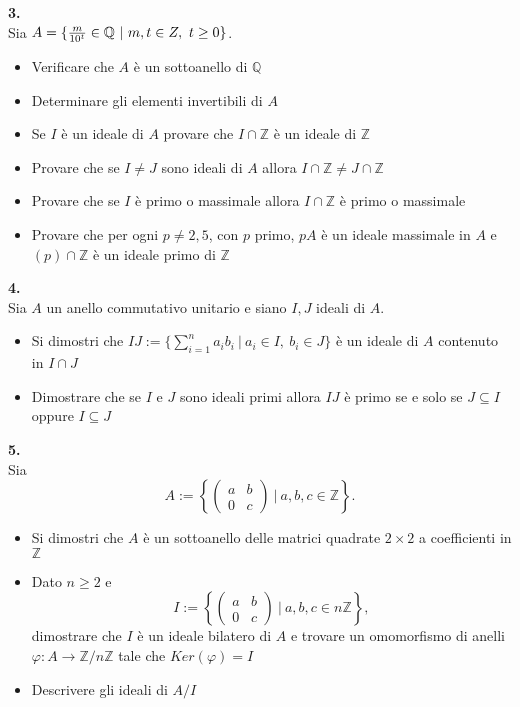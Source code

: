 \documentclass[italian,a4paper,11pt]
{article}
\newcommand{\Q}{\mathbb{Q}}
\newcommand{\Z}{\mathbb Z}
\newcommand{\acc}{\`}
\begin{document}
\vspace{0.4 cm}
\noindent
\begin{Ex}\textbf{ 3.}\\
Sia $A=\{{m\over{10^t}}\in \Q \ | \ m,t\in Z, \ t\geq 0\}$. 
\begin{itemize}
\item Verificare che $A$ \acc e un sottoanello di $\Q$
\item Determinare gli elementi invertibili di $A$
\item Se $I$ \acc e un ideale di $A$ provare che $I\cap\Z$ \acc e un ideale di $\Z$
\item Provare che se $I\neq J$ sono ideali di $A$ allora $I\cap\Z \neq J\cap\Z$
\item Provare che se $I$ \acc e primo o massimale allora $I\cap\Z$ \acc e primo o massimale
\item Provare che per ogni $p\neq 2,5$, con $p$ primo, $pA$ \acc e un ideale massimale in $A$ e $(p)\cap \Z$ \acc e un ideale primo di $\Z$
\end{itemize}
\end{Ex}

\vspace{0.4 cm}
\noindent
\begin{Ex}\textbf{ 4.}\\
Sia $A$ un anello commutativo unitario e siano $I,J$ ideali di $A$.
\begin{itemize}
\item Si dimostri che $IJ:=\{\sum_{i=1}^na_ib_i \ | \ a_i\in I, \ b_i\in J\}$ \acc e un ideale di $A$ contenuto in $I\cap J$
\item Dimostrare che se $I$ e $J$ sono ideali primi allora $IJ$ \acc e primo se e solo se $J\subseteq I$ oppure $I\subseteq J$ 
\end{itemize}
\end{Ex}


\vspace{0.4 cm}
\noindent
\begin{Ex}\textbf{ 5.}\\
Sia $$A:=\left\{\left(\begin{matrix} a & b \\ 0 & c \end{matrix} \right) \ | \ a,b,c\in \Z \right\}.$$
\begin{itemize}
\item Si dimostri che $A$ \acc e un sottoanello delle matrici quadrate $2\times2$ a coefficienti in $\Z$
\item Dato $n\geq2$ e $$I:=\left\{\left(\begin{matrix} a & b \\ 0 & c \end{matrix} \right) \ | \ a,b,c\in n\Z \right\},$$ dimostrare che $I$ \acc e un ideale bilatero di $A$ e trovare un omomorfismo di anelli $\varphi:A\longrightarrow\Z/n\Z$ tale che $Ker(\varphi)=I$
\item Descrivere gli ideali di $A/I$
\end{itemize}
\end{Ex}
\end{document}
